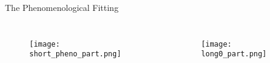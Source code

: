 \documentclass{beamer}
\begin{document}
\begin{frame}{The Phenomenological Fitting}
      \begin{columns}
            \begin{figure}
                \centering
                \texttt{[image: short\_pheno\_part.png]}
                \label{plasmashort}               
                \end{figure}
            \begin{figure}
                \centering
                \texttt{[image: long0\_part.png]}
                \label{plasmashort}               
                \end{figure}
          \end{columns} 

  

\end{frame}
\end{document}
